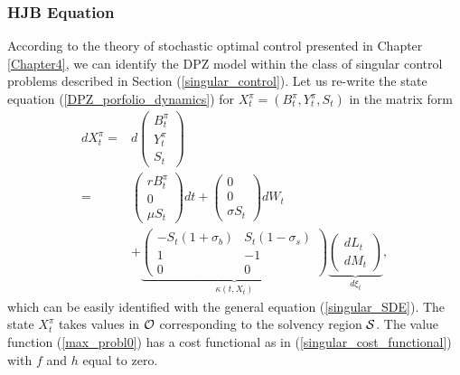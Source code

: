 \subsubsection{HJB Equation}\label{subsec_HJB}

According to the theory of stochastic optimal control presented in Chapter \ref{Chapter4},  
we can identify the DPZ model within the class of singular control problems described in Section (\ref{singular_control}).
Let us re-write the state equation (\ref{DPZ_porfolio_dynamics}) for $X^{\pi}_t = (B^{\pi}_t,Y^{\pi}_t,S_t)$ in the matrix form 
\begin{align}\label{DPZ_porfolio_dynamicsM}
d X^{\pi}_t
=& 
 d \left(
\begin{array}{l}
B^{\pi}_t\\
Y^{\pi}_t\\
S_t
\end{array} \right) \\ \nonumber
  =&  \left( \begin{array}{l}
r B^{\pi}_t\\
0\\
\mu S_{t}
\end{array} \right)
dt +  \left( \begin{array}{l}
0\\
0\\
\sigma S_{t}
\end{array} \right) dW_t \\ \nonumber
&+ \underbrace{\left( \begin{array}{cc}
-S_{t}(1+\sigma_b) & S_{t}(1-\sigma_s) \\
1 & -1 \\
0 & 0
\end{array} \right)}_{\kappa(t,X_t)}
\underbrace{\left( \begin{array}{l}
dL_t \\
dM_t 
\end{array} \right)}_{d\xi_t},
\end{align}
which can be easily identified with the general equation (\ref{singular_SDE}).
The state $X^{\pi}_t$ takes values in $\mathcal{O}$ corresponding to the solvency region $\mathcal{S}$.
The value function (\ref{max_probl0}) has a cost functional as in (\ref{singular_cost_functional}) with $f$ and $h$ equal to zero. 


